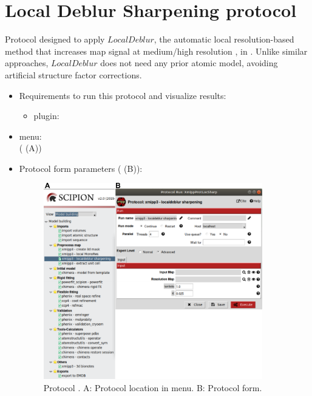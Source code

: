 \section{Local Deblur Sharpening protocol}
\label{app:localDeblurSharpening}%

Protocol designed to apply $LocalDeblur$, the automatic local resolution-based method that increases map signal at medium/high resolution \citep{ramirez2018}, in \scipion. Unlike similar approaches, $LocalDeblur$ does not need any prior atomic model, avoiding artificial structure factor corrections.

\begin{itemize}
 \item Requirements to run this protocol and visualize results:
    \begin{itemize}
        \item \scipion plugin: 
    \end{itemize}
 \item \scipion menu:\\
   ( (A))
  
 \item Protocol form parameters ( (B)):
  
    \begin{figure}[H]
     \centering 
     \captionsetup{width=.7\linewidth} 
     \includegraphics[width=0.90\textwidth]{Images_appendix/Fig208}
     \caption{Protocol . A: Protocol location in \scipion menu. B: Protocol form.}
     \label{fig:app_localdeblur_1}
    \end{figure}
    

\end{itemize}
